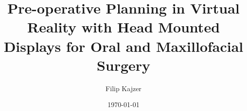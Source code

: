 \documentclass[twoside, parskip]{VRThesis} %
\title{Pre-operative Planning in Virtual Reality with Head Mounted Displays for Oral and Maxillofacial Surgery}
\author{Filip Kajzer}
\date{\today}
\newcommand\summaryname{Abstract}
\newenvironment{Abstract}%
    {\small\begin{center}%
    \bfseries{\summaryname} \end{center}}
\begin{document}
\maketitle
\maketitleMaster %

\makestatement

\begin{Abstract}
    
\end{Abstract}

\tableofcontents

\chapter{\label{chap::Introduction}Introduction}
TODO: Jeden Absatz zitieren


\chapter{\label{chap::RelatedWork}Related Work}

\section{\label{sec::MedicalImaging}Medical Imaging}

\section{\label{sec::VirtualRealityInMedicine}Virtual Reality in Medicine}

\section{\label{sec::SurgicalSimulations}Surgical Simulations}

\section{\label{sec::RelatedWorkDiscussion}Discussion - Limitations}



\chapter{\label{chap::Approach}Approach}

\end{document}

